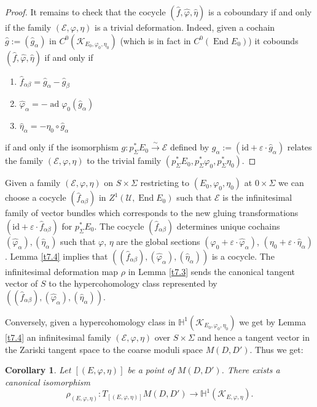 \documentclass[12pt,a4paper,oneside,english]{smfart}
\newtheorem{cor}[thm]{Corollary}
\theoremstyle{definition}
\theoremstyle{remark}
\DeclareMathOperator{\End}{End}
\DeclareMathOperator{\ad}{ad}
\newcommand{\cE}{\mathcal{E}}
\newcommand{\KK}{\mathscr{K}}
\newcommand{\HH}{\mathbb{H}}
\begin{document}
\begin{proof}
It remains to check that the cocycle $(\hat{f}, \hat{\varphi}, \hat{\eta})$ is a coboundary if and only if the family $(\cE, \varphi, \eta)$ is a trivial deformation. Indeed, given a cochain $\hat{g} := (\hat{g}_\alpha)$ in $C^0(\KK_{E_0, \varphi_0, \eta_0})$ (which is in fact in $C^0(\End E_0)$) it cobounds $(\hat{f}, \hat{\varphi}, \hat{\eta})$ if and only if
\begin{enumerate}
    \item $\hat{f}_{\alpha \beta} = \hat{g}_\alpha - \hat{g}_\beta$
    \item $\hat{\varphi}_\alpha = -\ad \varphi_0(\hat{g}_\alpha)$
    \item $\hat{\eta}_\alpha = -\eta_0 \circ \hat{g}_\alpha$
\end{enumerate}
if and only if the isomorphism $g \colon p_\Sigma^* E_0 \xrightarrow{\sim} \cE$ defined by $g_\alpha := (\mathrm{id} + \varepsilon \cdot \hat{g}_\alpha)$ relates the family $(\cE, \varphi, \eta)$ to the trivial family $(p_\Sigma^* E_0, p_\Sigma^* \varphi_0, p_\Sigma^* \eta_0)$.
\end{proof}

Given a family $(\cE, \varphi, \eta)$ on $S \times \Sigma$ restricting to $(E_0, \varphi_0, \eta_0)$ at $0 \times \Sigma$ we can choose a cocycle $(\hat{f}_{\alpha \beta})$ in $Z^1(\mathcal{U}, \End E_0)$ such that $\cE$ is the infinitesimal family of vector bundles which corresponds to the new gluing transformations $(\mathrm{id} + \varepsilon \cdot \hat{f}_{\alpha \beta})$ for $p_\Sigma^* E_0$. The cocycle $(\hat{f}_{\alpha \beta})$ determines unique cochains $(\hat{\varphi}_\alpha), (\hat{\eta}_\alpha)$ such that $\varphi$, $\eta$ are the global sections $(\varphi_0 + \varepsilon \cdot \hat{\varphi}_\alpha)$, $(\eta_0 + \varepsilon \cdot \hat{\eta}_\alpha)$. Lemma \ref{t7.4} implies that $((\hat{f}_{\alpha \beta}), (\hat{\varphi}_\alpha), (\hat{\eta}_\alpha))$ is a cocycle. The infinitesimal deformation map $\rho$ in Lemma \ref{t7.3} sends the canonical tangent vector of $S$ to the hypercohomology class represented by $((\hat{f}_{\alpha \beta}), (\hat{\varphi}_\alpha), (\hat{\eta}_\alpha))$.

Conversely, given a hypercohomology class in $\HH^1(\KK_{E_0, \varphi_0, \eta_0})$ we get by Lemma \ref{t7.4} an infinitesimal family $(\cE, \varphi, \eta)$ over $S \times \Sigma$ and hence a tangent vector in the Zariski tangent space to the coarse moduli space $M(D, D')$. Thus we get:

\begin{cor}\label{t7.5}
Let $[(E, \varphi, \eta)]$ be a point of $M(D, D')$. There exists a canonical isomorphism
\[
\rho_{(E, \varphi, \eta)} \colon T_{[(E, \varphi, \eta)]}M(D, D') \to \HH^1(\KK_{E, \varphi, \eta}).
\]
\end{cor}
\end{document}
